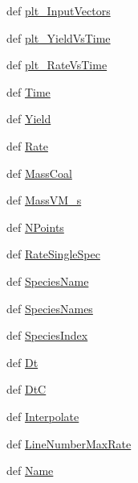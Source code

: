\begin{DoxyCompactItemize}
\item 
def \hyperlink{classFit__one__run_1_1Fit__one__run_a8f7f8188c2c37135e67632982964f34a}{plt\-\_\-\-Input\-Vectors}
\item 
def \hyperlink{classFit__one__run_1_1Fit__one__run_a6382bd698c58a57b0748ab459317ede0}{plt\-\_\-\-Yield\-Vs\-Time}
\item 
def \hyperlink{classFit__one__run_1_1Fit__one__run_aef2de6c940020edda5383c9dc0a24759}{plt\-\_\-\-Rate\-Vs\-Time}
\item 
def \hyperlink{classFit__one__run_1_1Fit__one__run_a87ccadc0e52128cc37a19b6032bc1583}{\-Time}
\item 
def \hyperlink{classFit__one__run_1_1Fit__one__run_a94a16b13e2eb75309f0cfd403a7e1047}{\-Yield}
\item 
def \hyperlink{classFit__one__run_1_1Fit__one__run_ac20ff79e8a10d41e8b39cfe15d18f423}{\-Rate}
\item 
def \hyperlink{classFit__one__run_1_1Fit__one__run_a21ec33c24095df5a6450a49a23fa6c8b}{\-Mass\-Coal}
\item 
def \hyperlink{classFit__one__run_1_1Fit__one__run_a606502eebf1f5f28308d3264ff6ce72a}{\-Mass\-V\-M\-\_\-s}
\item 
def \hyperlink{classFit__one__run_1_1Fit__one__run_ab737a97d00c7f40f240560776d1387d5}{\-N\-Points}
\item 
def \hyperlink{classFit__one__run_1_1Fit__one__run_ac30615dce69cf5bd8362ad04a6b2a725}{\-Rate\-Single\-Spec}
\item 
def \hyperlink{classFit__one__run_1_1Fit__one__run_a43b56556c25342482d01b717ddf2e813}{\-Species\-Name}
\item 
def \hyperlink{classFit__one__run_1_1Fit__one__run_ae41e258087d0ef31240ff4ff7cfbb0e7}{\-Species\-Names}
\item 
def \hyperlink{classFit__one__run_1_1Fit__one__run_a8bd23b5cea9a2b4a47d02a4bd8a321b9}{\-Species\-Index}
\item 
def \hyperlink{classFit__one__run_1_1Fit__one__run_a6886d23160b83d181923b4c92bf1bf21}{\-Dt}
\item 
def \hyperlink{classFit__one__run_1_1Fit__one__run_a23124d6b66b984d86c499f6c38fb9d3a}{\-Dt\-C}
\item 
def \hyperlink{classFit__one__run_1_1Fit__one__run_ad83729d5ab493caa0ae5c69b90fc28d1}{\-Interpolate}
\item 
def \hyperlink{classFit__one__run_1_1Fit__one__run_a54698580f9548b276eb6b058de7eda00}{\-Line\-Number\-Max\-Rate}
\item 
def \hyperlink{classFit__one__run_1_1Fit__one__run_ac471c563b5841ba5a9463d3f715579c8}{\-Name}
\end{DoxyCompactItemize}
